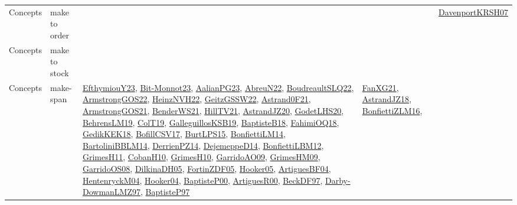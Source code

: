 {\begin{longtable}{lp{3cm}>{\raggedright}p{6cm}>{\raggedright}p{6cm}p{8cm}}
Concepts & make to order &  &  & \href{papers/DavenportKRSH07.pdf}{DavenportKRSH07}\cite{DavenportKRSH07}\\
Concepts & make to stock &  &  & \\
Concepts & make-span & \href{papers/EfthymiouY23.pdf}{EfthymiouY23}\cite{EfthymiouY23}, \href{papers/Bit-Monnot23.pdf}{Bit-Monnot23}\cite{Bit-Monnot23}, \href{papers/AalianPG23.pdf}{AalianPG23}\cite{AalianPG23}, \href{articles/AbreuN22.pdf}{AbreuN22}\cite{AbreuN22}, \href{papers/BoudreaultSLQ22.pdf}{BoudreaultSLQ22}\cite{BoudreaultSLQ22}, \href{papers/ArmstrongGOS22.pdf}{ArmstrongGOS22}\cite{ArmstrongGOS22}, \href{articles/HeinzNVH22.pdf}{HeinzNVH22}\cite{HeinzNVH22}, \href{papers/GeitzGSSW22.pdf}{GeitzGSSW22}\cite{GeitzGSSW22}, \href{papers/Astrand0F21.pdf}{Astrand0F21}\cite{Astrand0F21}, \href{papers/ArmstrongGOS21.pdf}{ArmstrongGOS21}\cite{ArmstrongGOS21}, \href{papers/BenderWS21.pdf}{BenderWS21}\cite{BenderWS21}, \href{papers/HillTV21.pdf}{HillTV21}\cite{HillTV21}, \href{articles/AstrandJZ20.pdf}{AstrandJZ20}\cite{AstrandJZ20}, \href{papers/GodetLHS20.pdf}{GodetLHS20}\cite{GodetLHS20}, \href{papers/BehrensLM19.pdf}{BehrensLM19}\cite{BehrensLM19}, \href{papers/ColT19.pdf}{ColT19}\cite{ColT19}, \href{papers/GalleguillosKSB19.pdf}{GalleguillosKSB19}\cite{GalleguillosKSB19}, \href{articles/BaptisteB18.pdf}{BaptisteB18}\cite{BaptisteB18}, \href{articles/FahimiOQ18.pdf}{FahimiOQ18}\cite{FahimiOQ18}, \href{articles/GedikKEK18.pdf}{GedikKEK18}\cite{GedikKEK18}, \href{papers/BofillCSV17.pdf}{BofillCSV17}\cite{BofillCSV17}, \href{papers/BurtLPS15.pdf}{BurtLPS15}\cite{BurtLPS15}, \href{papers/BonfiettiLM14.pdf}{BonfiettiLM14}\cite{BonfiettiLM14}, \href{papers/BartoliniBBLM14.pdf}{BartoliniBBLM14}\cite{BartoliniBBLM14}, \href{papers/DerrienPZ14.pdf}{DerrienPZ14}\cite{DerrienPZ14}, \href{papers/DejemeppeD14.pdf}{DejemeppeD14}\cite{DejemeppeD14}, \href{papers/BonfiettiLBM12.pdf}{BonfiettiLBM12}\cite{BonfiettiLBM12}, \href{papers/GrimesH11.pdf}{GrimesH11}\cite{GrimesH11}, \href{papers/CobanH10.pdf}{CobanH10}\cite{CobanH10}, \href{papers/GrimesH10.pdf}{GrimesH10}\cite{GrimesH10}, \href{articles/GarridoAO09.pdf}{GarridoAO09}\cite{GarridoAO09}, \href{papers/GrimesHM09.pdf}{GrimesHM09}\cite{GrimesHM09}, \href{articles/GarridoOS08.pdf}{GarridoOS08}\cite{GarridoOS08}, \href{papers/DilkinaDH05.pdf}{DilkinaDH05}\cite{DilkinaDH05}, \href{papers/FortinZDF05.pdf}{FortinZDF05}\cite{FortinZDF05}, \href{articles/Hooker05.pdf}{Hooker05}\cite{Hooker05}, \href{papers/ArtiguesBF04.pdf}{ArtiguesBF04}\cite{ArtiguesBF04}, \href{papers/HentenryckM04.pdf}{HentenryckM04}\cite{HentenryckM04}, \href{papers/Hooker04.pdf}{Hooker04}\cite{Hooker04}, \href{articles/BaptisteP00.pdf}{BaptisteP00}\cite{BaptisteP00}, \href{articles/ArtiguesR00.pdf}{ArtiguesR00}\cite{ArtiguesR00}, \href{papers/BeckDF97.pdf}{BeckDF97}\cite{BeckDF97}, \href{articles/Darby-DowmanLMZ97.pdf}{Darby-DowmanLMZ97}\cite{Darby-DowmanLMZ97}, \href{papers/BaptisteP97.pdf}{BaptisteP97}\cite{BaptisteP97} & \href{articles/FanXG21.pdf}{FanXG21}\cite{FanXG21}, \href{papers/AstrandJZ18.pdf}{AstrandJZ18}\cite{AstrandJZ18}, \href{papers/BonfiettiZLM16.pdf}{BonfiettiZLM16}\cite{BonfiettiZLM16}, 
\end{longtable}}
